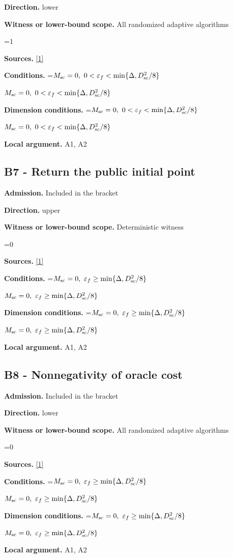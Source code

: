 \documentclass[10pt,a4paper]{article}
\newcommand{\AtlasMath}[1]{\par\begingroup\centering\setbox0=\hbox{$\displaystyle #1$}\ifdim\wd0>1.4\linewidth\typeout{ATLAS WIDE FORMULA: \the\wd0}\fi\ifdim\wd0>\linewidth\resizebox{\linewidth}{!}{\box0}\else\box0\fi\par\endgroup}
\newcommand{\AtlasInlineMath}[1]{\begingroup\setbox0=\hbox{$#1$}\ifdim\wd0>.4\linewidth\endgroup\AtlasMath{#1}\else\endgroup$#1$\fi}
\begin{document}
\textbf{Direction.} lower

\textbf{Witness or lower-bound scope.} All randomized adaptive algorithms

\AtlasMath{1}
\textbf{Sources.} \href{https://arxiv.org/pdf/2408.11022v1}{[1]}

\textbf{Conditions.} \AtlasInlineMath{M_{\rm sc}=0,\ 0<\varepsilon_f<\min\{\Delta,D_{\rm sc}^2/8\}}

\textbf{Dimension conditions.} \AtlasInlineMath{M_{\rm sc}=0,\ 0<\varepsilon_f<\min\{\Delta,D_{\rm sc}^2/8\}}

\textbf{Local argument.} A1, A2

\subsection{B7 - Return the public initial point}
\textbf{Admission.} Included in the bracket

\textbf{Direction.} upper

\textbf{Witness or lower-bound scope.} Deterministic witness

\AtlasMath{0}
\textbf{Sources.} \href{https://arxiv.org/pdf/2408.11022v1}{[1]}

\textbf{Conditions.} \AtlasInlineMath{M_{\rm sc}=0,\ \varepsilon_f\ge\min\{\Delta,D_{\rm sc}^2/8\}}

\textbf{Dimension conditions.} \AtlasInlineMath{M_{\rm sc}=0,\ \varepsilon_f\ge\min\{\Delta,D_{\rm sc}^2/8\}}

\textbf{Local argument.} A1, A2

\subsection{B8 - Nonnegativity of oracle cost}
\textbf{Admission.} Included in the bracket

\textbf{Direction.} lower

\textbf{Witness or lower-bound scope.} All randomized adaptive algorithms

\AtlasMath{0}
\textbf{Sources.} \href{https://arxiv.org/pdf/2408.11022v1}{[1]}

\textbf{Conditions.} \AtlasInlineMath{M_{\rm sc}=0,\ \varepsilon_f\ge\min\{\Delta,D_{\rm sc}^2/8\}}

\textbf{Dimension conditions.} \AtlasInlineMath{M_{\rm sc}=0,\ \varepsilon_f\ge\min\{\Delta,D_{\rm sc}^2/8\}}

\textbf{Local argument.} A1, A2
\end{document}
